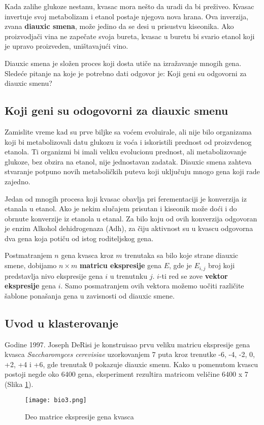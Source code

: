 Kada zalihe glukoze nestanu, kvasac mora nešto da uradi da bi preživeo. Kvasac invertuje svoj metabolizam i  etanol postaje njegova nova hrana. Ova inverzija, zvana \textbf{diauxic smena}, može jedino da se desi u prisustvu kiseonika. Ako proizvodjači vina ne zapečate svoja bureta, kvasac u buretu bi svario etanol koji je upravo proizveden, uništavajući vino.

Diauxic smena je složen proces koji dosta utiče na izražavanje mnogih gena. Sledeće pitanje na koje je potrebno dati odgovor je: Koji geni su odgovorni za diauxic smenu?

\subsection{Koji geni su odogovorni za diauxic smenu}
Zamislite vreme kad su prve biljke sa voćem evoluirale, ali nije bilo organizama koji bi metabolizovali datu glukozu iz voća i iskoristili prednost od proizvdenog etanola. Ti organizmi bi imali veliku evolucionu prednost, ali metabolizovanje glukoze, bez obzira na etanol, nije jednostavan zadatak. Diauxic smena zahteva stvaranje potpuno novih metaboličkih puteva koji uključuju mnogo gena koji rade zajedno.

Jedan od mnogih procesa koji kvasac obavlja pri ferementaciji je konverzija iz etanala u etanol. Ako je nekim slučajem prisutan i kiseonik može doći i do obrnute konverzije iz etanola u etanal. Za bilo koju od ovih konverzija odgovoran je enzim Alkohol dehidrogenaza (Adh), za čiju aktivnost su u kvascu odgovorna dva gena koja potiču od istog roditeljskog gena. 

Postmatranjem $n$ gena kvasca kroz $m$ trenutaka sa bilo koje strane diauxic smene, dobijamo $n \times m$ \textbf{matricu ekspresije} gena $E$, gde je $E_{i,j}$ broj koji predstavlja nivo ekspresije gena $i$ u trenutnku $j$. $i$-ti red se zove \textbf{vektor ekspresije} gena $i$. Samo posmatranjem ovih vektora možemo uočiti različite šablone ponašanja gena u zavisnosti od diauxic smene.

\subsection{Uvod u klasterovanje}
Godine 1997. Joseph DeRisi je konstruisao prvu veliku matricu ekspresije gena kvasca \textit{Saccharomyces cerevisiae} uzorkovanjem 7 puta kroz trenutke -6, -4, -2, 0, +2, +4 i +6, gde trenutak 0 pokazuje diauxic smenu. Kako u pomenutom kvascu postoji negde oko 6400 gena, eksperiment rezultira matricom veličine 6400 x 7 (Slika \ref{slika 2}). 
\begin{figure}[h]
    \centering
    \texttt{[image: bio3.png]}
    \caption{Deo matrice ekspresije gena kvasca}
    \label{slika 2}
\end{figure}

